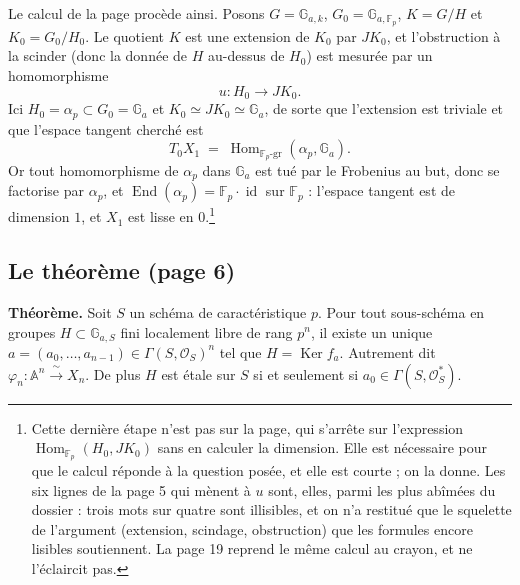 \documentclass[11pt,a4paper]{article}
\begin{document}
Le calcul de la page procède ainsi. Posons $G = \mathbb{G}_{a,k}$,
$G_0 = \mathbb{G}_{a,\mathbb{F}_p}$, $K = G/H$ et $K_0 = G_0/H_0$. Le
quotient $K$ est une extension de $K_0$ par $J K_0$, et l'obstruction à la
scinder (donc la donnée de $H$ au-dessus de $H_0$) est mesurée par un
homomorphisme
\[
  u : H_0 \longrightarrow J K_0 .
\]
Ici $H_0 = \alpha_p \subset G_0 = \mathbb{G}_a$ et
$K_0 \simeq J K_0 \simeq \mathbb{G}_a$, de sorte que l'extension est triviale
et que l'espace tangent cherché est
\[
  T_0 X_1 \;=\; \operatorname{Hom}_{\mathbb{F}_p\text{-gr}}(\alpha_p,
  \mathbb{G}_a) .
\]
Or tout homomorphisme de $\alpha_p$ dans $\mathbb{G}_a$ est tué par le
Frobenius au but, donc se factorise par $\alpha_p$, et
$\operatorname{End}(\alpha_p) = \mathbb{F}_p \cdot \operatorname{id}$ sur
$\mathbb{F}_p$ : l'espace tangent est de dimension $1$, et $X_1$ est lisse
en $0$.\footnote{Cette dernière étape n'est pas sur la page, qui s'arrête sur
l'expression $\operatorname{Hom}_{\mathbb{F}_p}(H_0, J K_0)$ sans en calculer
la dimension. Elle est nécessaire pour que le calcul réponde à la question
posée, et elle est courte ; on la donne. Les six lignes de la page 5 qui
mènent à $u$ sont, elles, parmi les plus abîmées du dossier : trois mots sur
quatre sont illisibles, et on n'a restitué que le squelette de l'argument
(extension, scindage, obstruction) que les formules encore lisibles
soutiennent. La page 19 reprend le même calcul au crayon, et ne l'éclaircit
pas.}

\subsection*{Le théorème (page 6)}

\textbf{Théorème.} Soit $S$ un schéma de caractéristique $p$. Pour tout
sous-schéma en groupes $H \subset \mathbb{G}_{a,S}$ fini localement libre de
rang $p^n$, il existe un unique
$a = (a_0, \dots, a_{n-1}) \in \Gamma(S, \mathcal{O}_S)^n$ tel que
$H = \operatorname{Ker} f_a$. Autrement dit
$\varphi_n : \mathbb{A}^n \xrightarrow{\ \sim\ } X_n$. De plus $H$ est étale
sur $S$ si et seulement si $a_0 \in \Gamma(S, \mathcal{O}_S^*)$.
\end{document}
